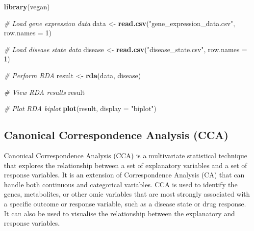 \documentclass[
]{book}
\newenvironment{Shaded}{\begin{snugshade}}{\end{snugshade}}
\newcommand{\AttributeTok}[1]{\textcolor[rgb]{0.13,0.29,0.53}{#1}}
\newcommand{\CommentTok}[1]{\textcolor[rgb]{0.56,0.35,0.01}{\textit{#1}}}
\newcommand{\DecValTok}[1]{\textcolor[rgb]{0.00,0.00,0.81}{#1}}
\newcommand{\FunctionTok}[1]{\textcolor[rgb]{0.13,0.29,0.53}{\textbf{#1}}}
\newcommand{\NormalTok}[1]{#1}
\newcommand{\OtherTok}[1]{\textcolor[rgb]{0.56,0.35,0.01}{#1}}
\newcommand{\StringTok}[1]{\textcolor[rgb]{0.31,0.60,0.02}{#1}}
\begin{document}
\begin{Shaded}
\begin{Highlighting}[]
\FunctionTok{library}\NormalTok{(vegan)}

\CommentTok{\# Load gene expression data}
\NormalTok{data }\OtherTok{\textless{}{-}} \FunctionTok{read.csv}\NormalTok{(}\StringTok{"gene\_expression\_data.csv"}\NormalTok{, }\AttributeTok{row.names =} \DecValTok{1}\NormalTok{)}

\CommentTok{\# Load disease state data}
\NormalTok{disease }\OtherTok{\textless{}{-}} \FunctionTok{read.csv}\NormalTok{(}\StringTok{"disease\_state.csv"}\NormalTok{, }\AttributeTok{row.names =} \DecValTok{1}\NormalTok{)}

\CommentTok{\# Perform RDA}
\NormalTok{result }\OtherTok{\textless{}{-}} \FunctionTok{rda}\NormalTok{(data, disease)}

\CommentTok{\# View RDA results}
\NormalTok{result}

\CommentTok{\# Plot RDA biplot}
\FunctionTok{plot}\NormalTok{(result, }\AttributeTok{display =} \StringTok{"biplot"}\NormalTok{)}
\end{Highlighting}
\end{Shaded}

\normalsize

\hypertarget{canonical-correspondence-analysis}{%
\subsection{Canonical Correspondence Analysis (CCA)}\label{canonical-correspondence-analysis}}

Canonical Correspondence Analysis (CCA) is a multivariate statistical technique that explores the relationship between a set of explanatory variables and a set of response variables. It is an extension of Correspondence Analysis (CA) that can handle both continuous and categorical variables. CCA is used to identify the genes, metabolites, or other omic variables that are most strongly associated with a specific outcome or response variable, such as a disease state or drug response. It can also be used to visualise the relationship between the explanatory and response variables.

\small
\end{document}
